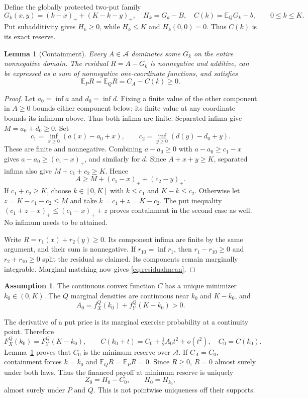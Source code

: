 \documentclass[11pt,a4paper]{amsart}
\theoremstyle{plain}
\newtheorem{lemma}[theorem]{Lemma}
\theoremstyle{definition}
\newtheorem{assumption}[theorem]{Assumption}
\theoremstyle{remark}
\newcommand{\EE}{\mathbb{E}}
\newcommand{\calA}{\mathcal{A}}
\begin{document}
Define the globally protected two-put family
\begin{equation}\label{eq:twoput}
 G_k(x,y)=(k-x)_++(K-k-y)_+,\quad H_k=G_k-B,
 \quad C(k)=\EE_QG_k-b,\qquad 0\le k\le K.
\end{equation}
Put subadditivity gives $H_k\ge0$, while $H_k\le K$ and $H_k(0,0)=0$. Thus $C(k)$ is its exact reserve.

\begin{lemma}[Containment]\label{lem:containment}
Every $A\in\calA$ dominates some $G_k$ on the entire nonnegative domain. The residual $R=A-G_k$ is nonnegative and additive, can be expressed as a sum of nonnegative one-coordinate functions, and satisfies
\begin{equation}\label{eq:residualmean}
 \EE_P R=\EE_Q R=C_A-C(k)\ge0.
\end{equation}
\end{lemma}
\begin{proof}
Let $a_0=\inf a$ and $d_0=\inf d$. Fixing a finite value of the other component in $A\ge0$ bounds either component below; its finite value at any coordinate bounds its infimum above. Thus both infima are finite. Separated infima give $M=a_0+d_0\ge0$. Set
\[
 c_1=\inf_{x\ge0}(a(x)-a_0+x),\qquad
 c_2=\inf_{y\ge0}(d(y)-d_0+y).
\]
These are finite and nonnegative. Combining $a-a_0\ge0$ with $a-a_0\ge c_1-x$ gives $a-a_0\ge(c_1-x)_+$, and similarly for $d$. Since $A+x+y\ge K$, separated infima also give $M+c_1+c_2\ge K$. Hence
\[
 A\ge M+(c_1-x)_++(c_2-y)_+.
\]
If $c_1+c_2\ge K$, choose $k\in[0,K]$ with $k\le c_1$ and $K-k\le c_2$. Otherwise let $z=K-c_1-c_2\le M$ and take $k=c_1+z=K-c_2$. The put inequality $(c_1+z-x)_+\le(c_1-x)_++z$ proves containment in the second case as well. No infimum needs to be attained.

Write $R=r_1(x)+r_2(y)\ge0$. Its component infima are finite by the same argument, and their sum is nonnegative. If $r_{10}=\inf r_1$, then $r_1-r_{10}\ge0$ and $r_2+r_{10}\ge0$ split the residual as claimed. Its components remain marginally integrable. Marginal matching now gives \eqref{eq:residualmean}.
\end{proof}

\begin{assumption}\label{ass:local}
The continuous convex function $C$ has a unique minimizer $k_0\in(0,K)$. The $Q$ marginal densities are continuous near $k_0$ and $K-k_0$, and
\[
 A_0=f_X^Q(k_0)+f_Y^Q(K-k_0)>0.
\]
\end{assumption}
The derivative of a put price is its marginal exercise probability at a continuity point. Therefore
\begin{equation}\label{eq:localcapital}
 F_X^Q(k_0)=F_Y^Q(K-k_0),\qquad
 C(k_0+t)=C_0+\tfrac12 A_0t^2+o(t^2),\quad C_0=C(k_0).
\end{equation}
Lemma~\ref{lem:containment} proves that $C_0$ is the minimum reserve over $\calA$. If $C_A=C_0$, containment forces $k=k_0$ and $\EE_QR=\EE_PR=0$. Since $R\ge0$, $R=0$ almost surely under both laws. Thus the financed payoff at minimum reserve is uniquely
\[
 Z_0=H_0-C_0,\qquad H_0=H_{k_0},
\]
almost surely under $P$ and $Q$. This is not pointwise uniqueness off their supports.
\end{document}
